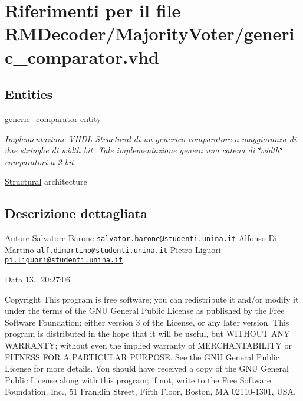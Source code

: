 \hypertarget{generic__comparator_8vhd}{\section{Riferimenti per il file R\+M\+Decoder/\+Majority\+Voter/generic\+\_\+comparator.vhd}
\label{generic__comparator_8vhd}
}
\subsection*{Entities}
\begin{DoxyCompactItemize}
\item 
\hyperlink{classgeneric__comparator}{generic\+\_\+comparator} entity
\begin{DoxyCompactList}\small\item\em Implementazione V\+H\+D\+L \hyperlink{classgeneric__comparator_1_1_structural}{Structural} di un generico comparatore a maggioranza di due stringhe di width bit. Tale implementazione genera una catena di \char`\"{}width\char`\"{} comparatori a 2 bit. \end{DoxyCompactList}\item 
\hyperlink{classgeneric__comparator_1_1_structural}{Structural} architecture
\end{DoxyCompactItemize}


\subsection{Descrizione dettagliata}
\begin{DoxyAuthor}{Autore}
Salvatore Barone \href{mailto:salvator.barone@studenti.unina.it}{\tt salvator.\+barone@studenti.\+unina.\+it} Alfonso Di Martino \href{mailto:alf.dimartino@studenti.unina.it}{\tt alf.\+dimartino@studenti.\+unina.\+it} Pietro Liguori \href{mailto:pi.liguori@studenti.unina.it}{\tt pi.\+liguori@studenti.\+unina.\+it} 
\end{DoxyAuthor}
\begin{DoxyDate}{Data}
13.. 20\+:27\+:06
\end{DoxyDate}
\begin{DoxyCopyright}{Copyright}
This program is free software; you can redistribute it and/or modify it under the terms of the G\+N\+U General Public License as published by the Free Software Foundation; either version 3 of the License, or any later version. This program is distributed in the hope that it will be useful, but W\+I\+T\+H\+O\+U\+T A\+N\+Y W\+A\+R\+R\+A\+N\+T\+Y; without even the implied warranty of M\+E\+R\+C\+H\+A\+N\+T\+A\+B\+I\+L\+I\+T\+Y or F\+I\+T\+N\+E\+S\+S F\+O\+R A P\+A\+R\+T\+I\+C\+U\+L\+A\+R P\+U\+R\+P\+O\+S\+E. See the G\+N\+U General Public License for more details. You should have received a copy of the G\+N\+U General Public License along with this program; if not, write to the Free Software Foundation, Inc., 51 Franklin Street, Fifth Floor, Boston, M\+A 02110-\/1301, U\+S\+A. 
\end{DoxyCopyright}
